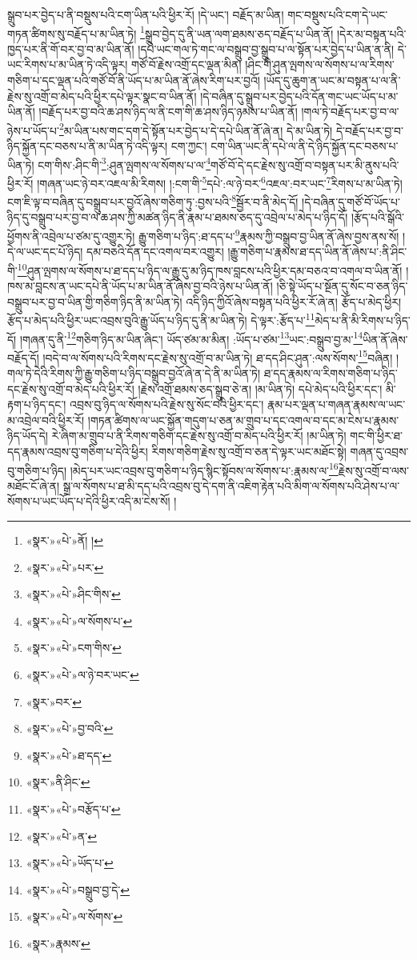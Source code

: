 སྒྲུབ་པར་བྱེད་པ་ནི་བསྡུས་པའི་ངག་ཡིན་པའི་ཕྱིར་རོ། །དེ་ཡང་། བརྗོད་མ་ཡིན། གང་བསྡུས་པའི་ངག་དེ་ཡང་གཏན་ཚིགས་སུ་བརྗོད་པ་མ་ཡིན་ཏེ། \footnote{«སྣར་»«པེ་»ནོ། ། }སྒྲུབ་བྱེད་དུ་ནི་ཡན་ལག་ཐམས་ཅད་བརྗོད་པ་ཡིན་ནོ། །དེར་མ་བསྟན་པའི་ཁྱད་པར་ནི་གོ་བར་བྱ་བ་མ་ཡིན་ནོ། །དཔེ་ཡང་གལ་ཏེ་གང་ལ་བསྒྲུབ་བྱ་སྒྲུབ་པ་ལ་སྟོན་པར་བྱེད་པ་ཡིན་ན་ནི། དེ་ཡང་རིགས་པ་མ་ཡིན་ཏེ་འདི་ལྟར། གཙོ་བོ་རྗེས་འགྲོ་དང་ལྡན་མིན། །ཤིང་གི་ཤུན་ལྤགས་ལ་སོགས་པ་ལ་རིགས་གཅིག་པ་དང་ལྡན་པའི་གཙོ་བོ་ནི་ཡོད་པ་མ་ཡིན་ནོ་ཞེས་རིག་པར་བྱའོ། །ཡོད་དུ་ཆུག་ན་ཡང་མ་བསྟན་པ་ལ་ནི་རྗེས་སུ་འགྲོ་བ་མེད་པའི་ཕྱིར་དཔེ་ལྟར་སྣང་བ་ཡིན་ནོ། །དེ་བཞིན་དུ་སྒྲུབ་པར་བྱེད་པའི་དོན་གང་ཡང་ཡོད་པ་མ་ཡིན་ནོ། །བརྗོད་པར་བྱ་བའི་ཆ་ཤས་ཉིད་ལ་ནི་ངག་གི་ཆ་ཤས་ཉིད་ཉམས་པ་ཡིན་ནོ། །གལ་ཏེ་བརྗོད་པར་བྱ་བ་ལ་ཉེས་པ་ཡོད་པ་\footnote{«སྣར་»«པེ་»པར་}མ་ཡིན་པས་གང་དག་དེ་སྟོན་པར་བྱེད་པ་དེ་དཔེ་ཡིན་ནོ་ཞེ་ན། དེ་མ་ཡིན་ཏེ། དེ་བརྗོད་པར་བྱ་བ་ཉིད་སྐྱོན་དང་བཅས་པ་ནི་མ་ཡིན་ཏེ་འདི་ལྟར། ངག་ཀྱང་། ངག་ཡིན་ཡང་ནི་དཔེ་ལ་ནི་དེ་ཉིད་སྐྱོན་དང་བཅས་པ་ཡིན་ཏེ། ངག་གིས་:ཤིང་གི་\footnote{«སྣར་»«པེ་»ཤིང་གིས་}:ཤུན་ལྤགས་ལ་སོགས་པ་ལ་\footnote{«སྣར་»«པེ་»ལ་སོགས་པ་}གཙོ་བོ་དེ་དང་རྗེས་སུ་འགྲོ་བ་བསྟན་པར་མི་ནུས་པའི་ཕྱིར་རོ། །གཞན་ཡང་ཉེ་བར་འཇལ་མི་རིགས། །:ངག་གི་\footnote{«སྣར་»«པེ་»ངག་གིས་}དཔེ་:ལ་ཉེ་བར་\footnote{«སྣར་»«པེ་»ལ་ཉེ་བར་ཡང་}འཇལ་:བར་ཡང་\footnote{«སྣར་»བར་}རིགས་པ་མ་ཡིན་ཏེ། ངག་ཇི་ལྟ་བ་བཞིན་དུ་བསྒྲུབ་པར་བྱའོ་ཞེས་གཅིག་ཏུ་:བྱས་པའི་\footnote{«སྣར་»«པེ་»བྱ་བའི་}སྦྱོར་བ་ནི་མེད་དོ། །དེ་བཞིན་དུ་གཙོ་བོ་ཡོད་པ་ཉིད་དུ་བསྒྲུབ་པར་བྱ་བ་ལ་ཆ་ཤས་ཀྱི་མཚན་ཉིད་ནི་རྣམ་པ་ཐམས་ཅད་དུ་འབྲེལ་པ་མེད་པ་ཉིད་དོ། །རྩོད་པའི་སྒོའི་ཕྱོགས་ནི་འབྲེལ་པ་ཙམ་དུ་འགྱུར་ཏེ། རྒྱུ་གཅིག་པ་ཉིད་:ཐ་དད་པ་\footnote{«སྣར་»«པེ་»ཐ་དད་}རྣམས་ཀྱི་བསྒྲུབ་བྱ་ཡིན་ནོ་ཞེས་བྱས་ནས་སོ། །དེ་ལ་ཡང་དང་པོ་ཉིད། དམ་བཅའི་དོན་དང་འགལ་བར་འགྱུར། །རྒྱུ་གཅིག་པ་རྣམས་ཐ་དད་ཡིན་ནོ་ཞེས་པ་:ནི་ཤིང་གི་\footnote{«སྣར་»ནི་ཤིང་}ཤུན་ལྤགས་ལ་སོགས་པ་ཐ་དད་པ་ཉིད་ལ་རྒྱུ་དུ་མ་ཉིད་ཁས་བླངས་པའི་ཕྱིར་དམ་བཅའ་བ་འགལ་བ་ཡིན་ནོ། །ཁས་མ་བླངས་ན་ཡང་དཔེ་ནི་ཡོད་པ་མ་ཡིན་ནོ་ཞེས་བྱ་བའི་ཉེས་པ་ཡིན་ནོ། །ཅི་སྟེ་ཡོད་པ་སྔོན་དུ་སོང་བ་ཅན་ཉིད་བསྒྲུབ་པར་བྱ་བ་ཡིན་གྱི་གཅིག་ཉིད་ནི་མ་ཡིན་ཏེ། འདི་ཉིད་ཀྱིའོ་ཞེས་བསྟན་པའི་ཕྱིར་རོ་ཞེ་ན། རྩོད་པ་མེད་ཕྱིར། རྩོད་པ་མེད་པའི་ཕྱིར་ཡང་འབྲས་བུའི་རྒྱུ་ཡོད་པ་ཉིད་དུ་ནི་མ་ཡིན་ཏེ། དེ་ལྟར་:རྩོད་པ་\footnote{«སྣར་»«པེ་»བརྩོད་པ་}མེད་པ་ནི་མི་རིགས་པ་ཉིད་དོ། །གཞན་དུ་ནི་\footnote{«སྣར་»«པེ་»ན་}གཅིག་ཉིད་མ་ཡིན་ཞིང་། ཡོད་ཙམ་མ་མིན། :ཡོད་པ་ཙམ་\footnote{«སྣར་»«པེ་»ཡོད་པ་}ཡང་:བསྒྲུབ་བྱ་མ་\footnote{«སྣར་»«པེ་»བསྒྲུབ་བྱ་དེ་}ཡིན་ནོ་ཞེས་བརྗོད་དོ། །བདེ་བ་ལ་སོགས་པའི་རིགས་དང་རྗེས་སུ་འགྲོ་བ་མ་ཡིན་ཏེ། ཐ་དད་ཤིང་ཤུན་:ལས་སོགས་\footnote{«སྣར་»«པེ་»ལ་སོགས་}བཞིན། །གལ་ཏེ་དེའི་རིགས་ཀྱི་རྒྱུ་གཅིག་པ་ཉིད་བསྒྲུབ་བྱའོ་ཞེ་ན་དེ་ནི་མ་ཡིན་ཏེ། ཐ་དད་རྣམས་ལ་རིགས་གཅིག་པ་ཉིད་དང་རྗེས་སུ་འགྲོ་བ་མེད་པའི་ཕྱིར་རོ། །རྗེས་འགྲོ་ཐམས་ཅད་སྒྲུབ་ཅེ་ན། །མ་ཡིན་ཏེ། དཔེ་མེད་པའི་ཕྱིར་དང་། མི་རྟག་པ་ཉིད་དང་། འབྲས་བུ་ཉིད་ལ་སོགས་པའི་རྗེས་སུ་སོང་བའི་ཕྱིར་དང་། རྣམ་པར་ལྡན་པ་གཞན་རྣམས་ལ་ཡང་མ་འབྲེལ་བའི་ཕྱིར་རོ། །གཏན་ཚིགས་ལ་ཡང་སྐྱོན་གདུག་པ་ཅན་མ་གྲུབ་པ་དང་འགལ་བ་དང་མ་ངེས་པ་རྣམས་ཉིད་ཡོད་དེ། རེ་ཞིག་མ་གྲུབ་པ་ནི་རིགས་གཅིག་དང་རྗེས་སུ་འགྲོ་བ་མེད་པའི་ཕྱིར་རོ། །མ་ཡིན་ཏེ། གང་གི་ཕྱིར་ཐ་དད་རྣམས་འབྲས་བུ་གཅིག་པ་དེའི་ཕྱིར། རིགས་གཅིག་རྗེས་སུ་འགྲོ་བ་ཅན་དེ་ལྟར་ཡང་མཐོང་སྟེ། གཞན་དུ་འབྲས་བུ་གཅིག་པ་ཉིད། །མེད་པར་ཡང་འབྲས་བུ་གཅིག་པ་ཉིད་སྙིང་སྟོབས་ལ་སོགས་པ་:རྣམས་ལ་\footnote{«སྣར་»རྣམས་}རྗེས་སུ་འགྲོ་བ་ལས་མཐོང་ངོ་ཞེ་ན། སྒྲ་ལ་སོགས་པ་ཐ་མི་དད་པའི་འབྲས་བུ་དེ་དག་ནི་འཇིག་རྟེན་པའི་མིག་ལ་སོགས་པའི་ཤེས་པ་ལ་སོགས་པ་ཡང་ཡོད་པ་དེའི་ཕྱིར་འདི་མ་ངེས་སོ། །
